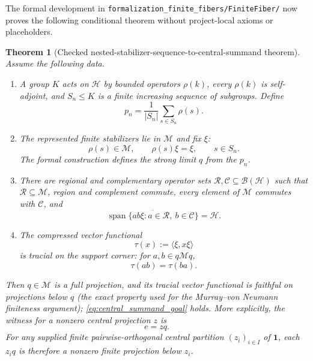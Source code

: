 \documentclass[11pt,reqno]{amsart}
\numberwithin{equation}{section}
\newtheorem{theorem}{Theorem}[section]
\theoremstyle{definition}
\theoremstyle{remark}
\newcommand{\cB}{\mathcal B}
\newcommand{\cH}{\mathcal H}
\newcommand{\cM}{\mathcal M}
\newcommand{\cR}{\mathcal R}
\newcommand{\cC}{\mathcal C}
\newcommand{\id}{\mathbf 1}
\begin{document}
The formal development in
\texttt{formalization\_finite\_fibers/FiniteFiber/} now proves the following
conditional theorem without project-local axioms or placeholders.

\begin{theorem}[Checked nested-stabilizer-sequence-to-central-summand theorem]
\label{thm:checked_stabilizer_to_central_summand}
Assume the following data.
\begin{enumerate}[label=\textup{(H\arabic*)},leftmargin=3.1em]
  \item A group $K$ acts on $\cH$ by bounded operators $\rho(k)$, every
  $\rho(k)$ is self-adjoint, and $S_n\leq K$ is a finite increasing sequence
  of subgroups.  Define
  \begin{equation}
    p_n=\frac{1}{\lvert S_n\rvert}\sum_{s\in S_n}\rho(s).
    \label{eq:stabilizer_group_average}
  \end{equation}
  \item The represented finite stabilizers lie in $\cM$ and fix $\xi$:
  \begin{equation}
    \rho(s)\in\cM,
    \qquad
    \rho(s)\xi=\xi,
    \qquad s\in S_n.
    \label{eq:represented_stabilizers_fix_xi}
  \end{equation}
  The formal construction defines the strong limit $q$ from the $p_n$.
  \item There are regional and complementary operator sets
  $\cR,\cC\subseteq\cB(\cH)$ such that $\cR\subseteq\cM$,
  region and complement commute, every element of $\cM$ commutes with
  $\cC$, and
  \begin{equation}
    \overline{\operatorname{span}\{ab\xi:a\in\cR,\ b\in\cC\}}=\cH.
    \label{eq:product_orbit_dense}
  \end{equation}
  \item The compressed vector functional
  \begin{equation}
    \tau(x):=\langle\xi,x\xi\rangle
    \label{eq:compressed_vector_functional}
  \end{equation}
  is tracial on the support corner: for $a,b\in q\cM q$,
  \begin{equation}
    \tau(ab)=\tau(ba).
    \label{eq:corner_traciality}
  \end{equation}
\end{enumerate}
Then $q\in\cM$ is a full projection, and its tracial vector functional is
faithful on projections below $q$ (the exact property used for the
Murray--von Neumann finiteness argument); \eqref{eq:central_summand_goal}
holds.  More explicitly, the witness for a nonzero central projection $z$ is
\begin{equation}
  e=zq.
  \label{eq:canonical_central_witness}
\end{equation}
For any supplied finite pairwise-orthogonal central partition
$(z_i)_{i\in I}$ of $\id$, each $z_iq$ is therefore a nonzero finite
projection below $z_i$.
\end{theorem}
\end{document}
